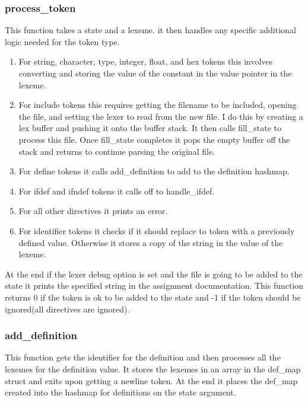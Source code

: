 \documentclass[11pt]{article}
\begin{document}
            \subsubsection{process\_token}
                This function takes a state and a lexeme. it then handles any specific additional logic needed for the token type.
                \begin{enumerate}
                    \item For string, character, type, integer, float, and hex tokens this involves converting and storing the value of the constant
                    in the value pointer in the lexeme. 
                    \item For include tokens this requires getting the filename to be included, opening the file,
                    and setting the lexer to read from the new file. I do this by creating a lex buffer and pushing it onto the buffer stack.
                    It then calls fill\_state to process this file. Once fill\_state completes it pops the empty buffer off the stack and returns
                    to continue parsing the original file.
                    \item For define tokens it calls add\_definition to add to the definition hashmap.\\
                    \item For ifdef and ifndef tokens it calls off to handle\_ifdef.
                    \item For all other directives it prints an error.
                    \item For identifier tokens it checks if it should replace to token with a previously defined value.
                    Otherwise it stores a copy of the string in the value of the lexeme.\\
                \end{enumerate}
                At the end if the lexer debug option is set and the file is going to be added to the state it prints the specified string in the
                assignment documentation. This function returns 0 if the token is ok to be added to the state and -1 if the token should
                be ignored(all directives are ignored).

            \subsubsection{add\_definition}
                This function gets the identifier for the definition and then processes all the lexemes for the definition
                value. It stores the lexemes in an array in the def\_map struct and exits upon getting a newline token. At the end
                it places the def\_map created into the hashmap for definitions on the state argument.
\end{document}
